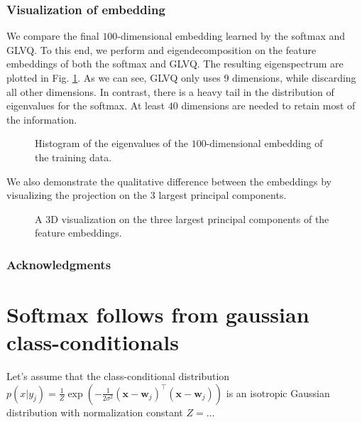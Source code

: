 \documentclass{article} %
\begin{document}
\subsubsection{Visualization of embedding}
We compare the final $100$-dimensional embedding learned by the softmax and GLVQ. To this end, we perform and eigendecomposition on the feature embeddings of both the softmax and GLVQ. The resulting eigenspectrum are plotted in Fig. \ref{figure:eigenspectrum}. As we can see, GLVQ only uses $9$ dimensions, while discarding all other dimensions. In contrast, there is a heavy tail in the distribution of eigenvalues for the softmax. At least $40$ dimensions are needed to retain most of the information. 
 
\begin{figure}[ht]
\caption{Histogram of the eigenvalues of the $100$-dimensional embedding of the training data. }
\label{figure:eigenspectrum}
\end{figure}

We also demonstrate the qualitative difference between the embeddings by visualizing the projection on the $3$ largest principal components. 

\begin{figure}[ht]
\caption{A 3D visualization on the three largest principal components of the feature embeddings. }
\end{figure}


\subsubsection*{Acknowledgments}





\appendix

\section{Softmax follows from gaussian class-conditionals}
Let's assume that the class-conditional distribution $p(x|y_j) = \frac{1}{Z} \exp(-\frac{1}{2\sigma^2}(\mathbf{x} - \mathbf{w}_j)^{\top}(\mathbf{x} - \mathbf{w}_j))$ is an isotropic Gaussian distribution with normalization constant $Z = ..$. 
\end{document}
